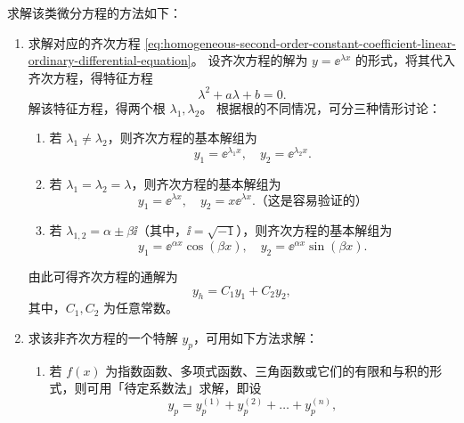 求解该类微分方程的方法如下：
\begin{enumerate}
    \item 求解对应的齐次方程 \cref{eq:homogeneous-second-order-constant-coefficient-linear-ordinary-differential-equation}。
          设齐次方程的解为 $ y = \ee^{\lambda x} $ 的形式，将其代入齐次方程，得特征方程
          \begin{equation*}
              \lambda^2 + a \lambda + b = 0 .
          \end{equation*}
          解该特征方程，得两个根 $ \lambda_1 , \lambda_2 $。
          根据根的不同情况，可分三种情形讨论：
          \begin{enumerate}
              \item 若 $ \lambda_1 \neq \lambda_2 $，则齐次方程的基本解组为
                    \begin{equation*}
                        y_1 = \ee^{\lambda_1 x} , \quad y_2 = \ee^{\lambda_2 x} .
                    \end{equation*}
              \item 若 $ \lambda_1 = \lambda_2 = \lambda $，则齐次方程的基本解组为
                    \begin{equation*}
                        y_1 = \ee^{\lambda x} , \quad y_2 = x \ee^{\lambda x} .\text{（这是容易验证的）}
                    \end{equation*}
              \item 若 $ \lambda_{1,2} = \alpha \pm \beta \ii $（其中，$ \ii = \sqrt{-1} $），则齐次方程的基本解组为
                    \begin{equation*}
                        y_1 = \ee^{\alpha x} \cos (\beta x) , \quad y_2 = \ee^{\alpha x} \sin (\beta x) .
                    \end{equation*}
          \end{enumerate}
          由此可得齐次方程的通解为
          \begin{equation*}
              y_h = C_1 y_1 + C_2 y_2 ,
          \end{equation*}
          其中，$ C_1 , C_2 $ 为任意常数。
    \item 求该非齐次方程的一个特解 $ y_p $，可用如下方法求解：
          \begin{enumerate}
              \item 若 $ f(x) $ 为指数函数、多项式函数、三角函数或它们的有限和与积的形式，则可用「待定系数法」求解，即设
                    \begin{equation*}
                        y_p = y_p^{(1)} + y_p^{(2)} + \ldots + y_p^{(n)} ,

\end{equation*}
\end{enumerate}
\end{enumerate}
